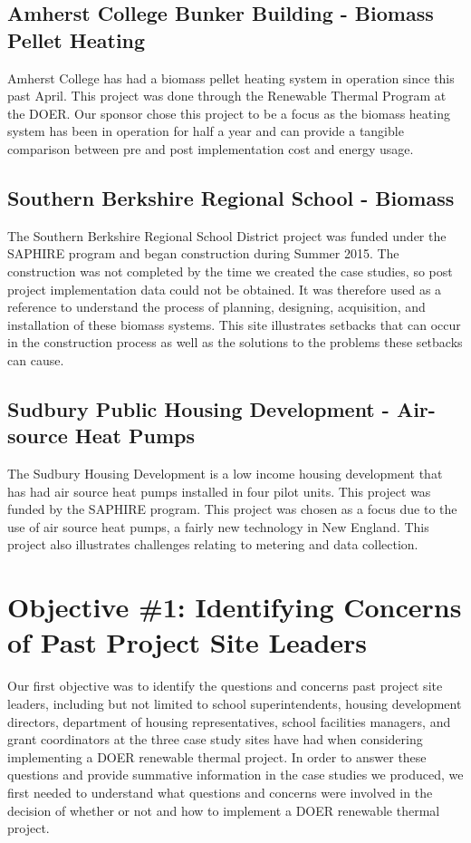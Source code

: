     \subsection{Amherst College Bunker Building - Biomass Pellet Heating}
    \par Amherst College has had a biomass pellet heating system in operation since this past April. This project was done through the Renewable Thermal Program at the DOER. Our sponsor chose this project to be a focus as the biomass heating system has been in operation for half a year and can provide a tangible comparison between pre and post implementation cost and energy usage.

    \subsection{Southern Berkshire Regional School - Biomass}
    \par The Southern Berkshire Regional School District project was funded under the SAPHIRE program and began construction during Summer 2015. The construction was not completed by the time we created the case studies, so post project implementation data could not be obtained. It was therefore used as a reference to understand the process of planning, designing, acquisition, and installation of these biomass systems. This site illustrates setbacks that can occur in the construction process as well as the solutions to the problems these setbacks can cause.

    \subsection{Sudbury Public Housing Development - Air-source Heat Pumps}
    \par The Sudbury Housing Development is a low income housing development that has had air source heat pumps installed in four pilot units. This project was funded by the SAPHIRE program. This project was chosen as a focus due to the use of air source heat pumps, a fairly new technology in New England. This project also illustrates challenges relating to metering and data collection.

  \section{Objective \#1: Identifying Concerns of Past Project Site Leaders}
  \par Our first objective was to identify the questions and concerns past project site leaders, including but not limited to school superintendents, housing development directors, department of housing representatives, school facilities managers, and grant coordinators at the three case study sites have had when considering implementing a DOER renewable thermal project. In order to answer these questions and provide summative information in the case studies we produced, we first needed to understand what questions and concerns were involved in the decision of whether or not and how to implement a DOER renewable thermal project. 

